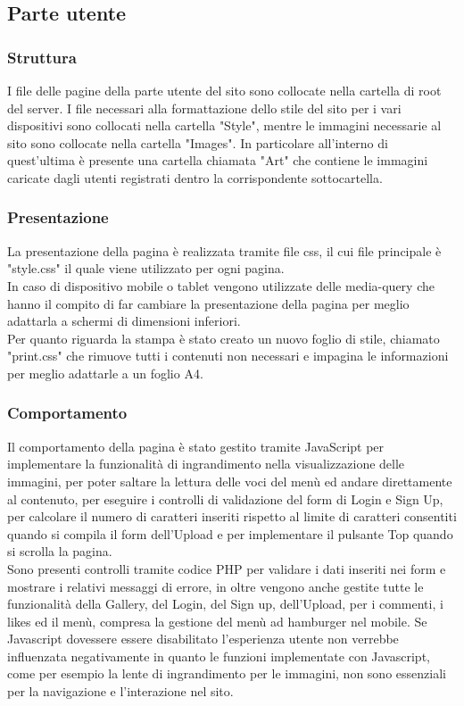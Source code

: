 \documentclass[openany, a4paper, 12pt]{report}
\begin{document}
		\subsection{Parte utente}
			\subsubsection{Struttura}
			I file delle pagine della parte utente del sito sono collocate nella cartella di root del server. I file necessari alla formattazione dello stile del sito per i vari dispositivi sono collocati nella cartella "Style", mentre le immagini necessarie al sito sono collocate nella cartella "Images". In particolare all'interno di quest'ultima è presente una cartella chiamata "Art" che contiene le immagini caricate dagli utenti registrati dentro la corrispondente sottocartella.
			\subsubsection{Presentazione}
			La presentazione della pagina è realizzata tramite file css, il cui file principale è "style.css" il quale viene utilizzato per ogni pagina.\\
			In caso di dispositivo mobile o tablet vengono utilizzate delle media-query che hanno il compito di far cambiare la presentazione della pagina per meglio adattarla a schermi di dimensioni inferiori.\\
			Per quanto riguarda la stampa è stato creato un nuovo foglio di stile, chiamato "print.css" che rimuove tutti i contenuti non necessari e impagina le informazioni per meglio adattarle a un foglio A4. 
		
			\subsubsection{Comportamento}
			Il comportamento della pagina è stato gestito tramite JavaScript per implementare la funzionalità di ingrandimento nella visualizzazione delle immagini, per poter saltare la lettura delle voci del menù ed andare direttamente al contenuto, per eseguire i controlli di validazione del form di Login e Sign Up, per calcolare il numero di caratteri inseriti rispetto al limite di caratteri consentiti quando si compila il form dell'Upload e per implementare il pulsante Top quando si scrolla la pagina.\\
			Sono presenti controlli tramite codice PHP per validare i dati inseriti nei form e mostrare i relativi messaggi di errore, in oltre vengono anche gestite tutte le funzionalità della Gallery, del Login, del Sign up, dell'Upload, per i commenti, i likes ed il menù, compresa la gestione del menù ad hamburger nel mobile. Se Javascript dovessere essere disabilitato l'esperienza utente non verrebbe influenzata negativamente in quanto le funzioni implementate con Javascript, come per esempio la lente di ingrandimento per le immagini, non sono essenziali per la navigazione e l'interazione nel sito.
\end{document}
